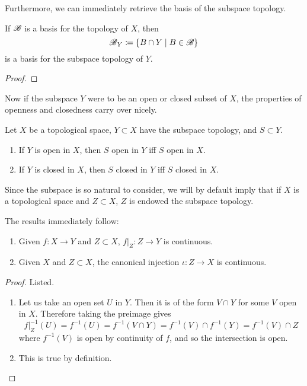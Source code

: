   Furthermore, we can immediately retrieve the basis of the subspace topology. 

  \begin{theorem}
    If $\operatorname{\mathscr{B}}$ is a basis for the topology of $X$, then 
    \begin{equation}
      \operatorname{\mathscr{B}}_Y \coloneqq \{B \cap Y \mid B \in \operatorname{\mathscr{B}} \} 
    \end{equation}
    is a basis for the subspace topology of $Y$. 
  \end{theorem}
  \begin{proof}
    
  \end{proof} 

  Now if the subspace $Y$ were to be an open or closed subset of $X$, the properties of openness and closedness carry over nicely. 

  \begin{lemma}
    Let $X$ be a topological space, $Y \subset X$ have the subspace topology, and $S \subset Y$. 
    \begin{enumerate}
      \item If $Y$ is open in $X$, then $S$ open in $Y$ iff $S$ open in $X$. 
      \item If $Y$ is closed in $X$, then $S$ closed in $Y$ iff $S$ closed in $X$. 
    \end{enumerate}
  \end{lemma}

  Since the subspace is so natural to consider, we will by default imply that if $X$ is a topological space and $Z \subset X$, $Z$ is endowed the subspace topology. 

  \begin{lemma}
    The results immediately follow: 
    \begin{enumerate}
      \item Given $f: X \rightarrow Y$ and $Z \subset X$, $f|_{Z} : Z \rightarrow Y$ is continuous. 
      \item Given $X$ and $Z \subset X$, the canonical injection $\iota: Z \rightarrow X$ is continuous. 
    \end{enumerate}
  \end{lemma}
  \begin{proof}
    Listed. 
    \begin{enumerate}
      \item Let us take an open set $U$ in $Y$. Then it is of the form $V \cap Y$ for some $V$ open in $X$. Therefore taking the preimage gives 
      \begin{equation}
        f|_{Z}^{-1} (U) = f^{-1} (U) = f^{-1} (V \cap Y) = f^{-1} (V) \cap f^{-1} (Y) = f^{-1} (V) \cap Z
      \end{equation}
      where $f^{-1} (V)$ is open by continuity of $f$, and so the intersection is open. 

      \item This is true by definition. 
    \end{enumerate}
  \end{proof}

